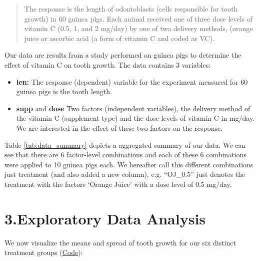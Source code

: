 \documentclass[]{article}
\providecommand{\tightlist}{%
  \setlength{\itemsep}{0pt}\setlength{\parskip}{0pt}}
\begin{document}
\begin{quote}
The response is the length of odontoblasts (cells responsible for tooth
growth) in 60 guinea pigs. Each animal received one of three dose levels
of vitamin C (0.5, 1, and 2 mg/day) by one of two delivery methods,
(orange juice or ascorbic acid (a form of vitamin C and coded as VC).
\end{quote}

Our data are results from a study performed on guinea pigs to determine
the effect of vitamin C on tooth growth. The data contains 3 variables:

\begin{itemize}
\tightlist
\item
  \textbf{len:} The response (dependent) variable for the experiment
  measured for 60 guinea pigs is the tooth length.
\item
  \textbf{supp} and \textbf{dose} Two factors (independent variables),
  the delivery method of the vitamin C (supplement type) and the dose
  levels of vitamin C in mg/day. We are interested in the effect of
  these two factors on the response.
\end{itemize}

Table \ref{tab:data_summary} depicts a aggregated summary of our data.
We can see that there are 6 factor-level combinations and each of these
6 combinations were applied to 10 guinea pigs each. We hereafter call
this different combinations just treatment (and also added a new
column), e.g. ``OJ\_0.5'' just denotes the treatment with the factors
`Orange Juice' with a dose level of 0.5 mg/day.

\section{3.Exploratory Data Analysis}\label{exploratory-data-analysis}

We now visualize the means and spread of tooth growth for our six
distinct treatment groups (\protect\hyperlink{Appendix_1}{Code}):
\end{document}
